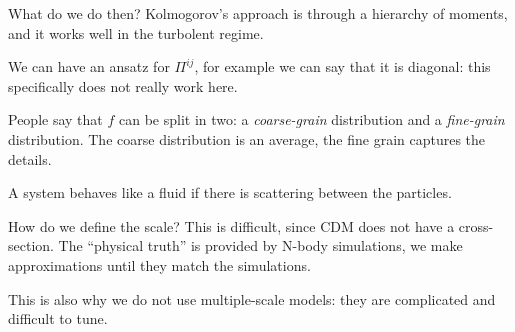 \documentclass[main.tex]{subfiles}
\begin{document}
What do we do then? Kolmogorov's approach is through a hierarchy of moments, and it works well in the turbolent regime. 

We can have an ansatz for \(\Pi^{ij}\), for example we can say that it is diagonal: this specifically does not really work here. 

People say that \(f\) can be split in two: a \emph{coarse-grain} distribution and a \emph{fine-grain} distribution. The coarse distribution is an average, the fine grain captures the details. 

A system behaves like a fluid if there is scattering between the particles. 

How do we define the scale? This is difficult, since CDM does not have a cross-section.
The ``physical truth'' is provided by N-body simulations, we make approximations until they match the simulations.

This is also why we do not use multiple-scale models: they are complicated and difficult to tune.
\end{document}
